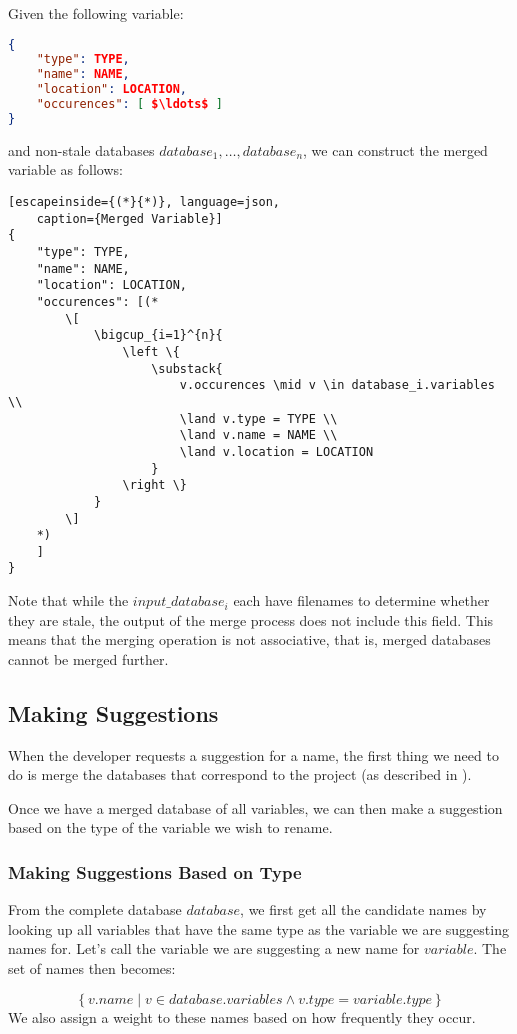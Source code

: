 Given the following variable:
\begin{lstlisting}[mathescape, language=json, caption={Example Variable}]
{
	"type": TYPE,
	"name": NAME,
	"location": LOCATION,
	"occurences": [ $\ldots$ ]
}
\end{lstlisting}
and non-stale databases $database_1, \ldots, database_n$, we can construct the
merged variable as follows:

\begin{lstlisting}[escapeinside={(*}{*)}, language=json,
	caption={Merged Variable}]
{
	"type": TYPE,
	"name": NAME,
	"location": LOCATION,
	"occurences": [(*
		\[
			\bigcup_{i=1}^{n}{
				\left \{
					\substack{
						v.occurences \mid v \in database_i.variables \\
						\land v.type = TYPE \\
						\land v.name = NAME \\
						\land v.location = LOCATION
					}
				\right \}
			}
		\]
	*)
	]
}
\end{lstlisting}
Note that while the $input\_database_i$ each have filenames to determine
whether they are stale, the output of the merge process does not include this
field. This means that the merging operation is not associative, that is, merged
databases cannot be merged further.

\subsection{Making Suggestions}
\label{sec:suggesting}

When the developer requests a suggestion for a name, the first thing we need to
do is merge the databases that correspond to the project (as described in
).

Once we have a merged database of all variables, we can then make a suggestion
based on the type of the variable we wish to rename.

\subsubsection{Making Suggestions Based on Type}

From the complete database $database$, we first get all the candidate names by
looking up all variables that have the same type as the variable we are
suggesting names for. Let's call the variable we are suggesting a new name for
$variable$. The set of names then becomes:

\[
	\left \{ v.name
			\mid v \in database.variables \land v.type = variable.type \right \}
\]
We also assign a weight to these names based on how frequently they occur.

